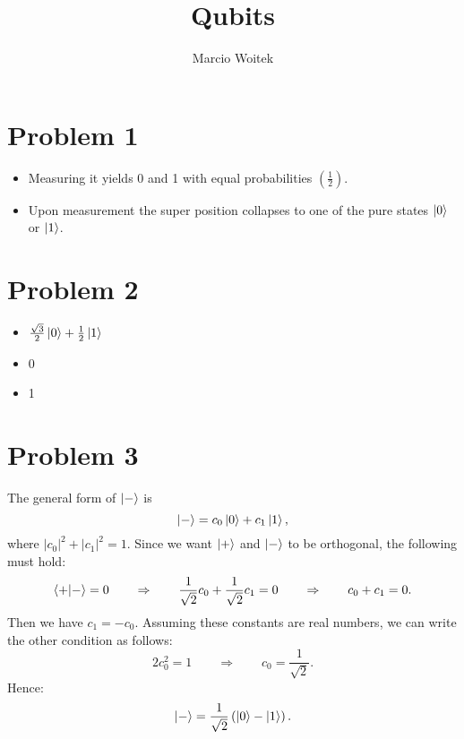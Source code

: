 \documentclass[11pt]{article}
\author{Marcio Woitek}
\date{}
\title{Qubits}
\newcommand{\invroot}[1]{\frac{1}{\sqrt{#1}}}
\newcommand{\sqnorm}[1]{\left|#1\right|^2}
\begin{document}
\maketitle
\thispagestyle{empty}
\pagestyle{empty}
\section*{Problem 1}
\label{sec:org1c82b41}
\begin{itemize}
\item Measuring it yields 0 and 1 with equal probabilities
\(\left(\frac{1}{2}\right)\).
\item Upon measurement the super position collapses to one of the pure states
\(\ket{0}\) or \(\ket{1}\).
\end{itemize}
\section*{Problem 2}
\label{sec:org712a166}
\begin{itemize}
\item \(\frac{\sqrt{3}}{2}\ket{0}+\frac{1}{2}\ket{1}\)
\item 0
\item 1
\end{itemize}
\section*{Problem 3}
\label{sec:org5405d4d}
The general form of \(\ket{-}\) is
\begin{equation}
\ket{-}=c_0\ket{0}+c_1\ket{1},
\end{equation}
where \(\sqnorm{c_0}+\sqnorm{c_1}=1\). Since we want \(\ket{+}\) and
\(\ket{-}\) to be orthogonal, the following must hold:
\begin{equation}
\braket{+|-}=0\qquad\Rightarrow\qquad\invroot{2}c_0+\invroot{2}c_1=0\qquad\Rightarrow\qquad c_0+c_1=0.
\end{equation}
Then we have \(c_1=-c_0\). Assuming these constants are real numbers, we can
write the other condition as follows:
\begin{equation}
2c_0^2=1\qquad\Rightarrow\qquad c_0=\invroot{2}.
\end{equation}
Hence:
\begin{equation}
\ket{-}=\invroot{2}\left(\ket{0}-\ket{1}\right).
\end{equation}
\end{document}
